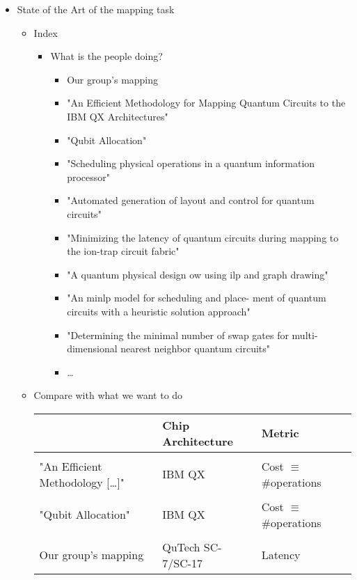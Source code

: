 \begin{itemize}
\item State of the Art of the mapping task
\label{sec:orgf682750}

\begin{itemize}
\item Index
\label{sec:org0689b92}
\begin{itemize}
\item What is the people doing?
\label{sec:org91237ce}
\small

\begin{itemize}
\item Our group's mapping
\item "An Efficient Methodology for Mapping Quantum Circuits to the IBM QX Architectures"
\item "Qubit Allocation"
\item "Scheduling physical operations in a quantum information processor"
\item "Automated generation of layout and control for quantum circuits"
\item "Minimizing the latency of quantum circuits during mapping to the ion-trap circuit fabric"
\item "A quantum physical design  ow using ilp and graph drawing"
\item "An minlp model for scheduling and place- ment of quantum circuits with a heuristic solution approach"
\item "Determining the minimal number of swap gates for multi- dimensional nearest neighbor quantum circuits"
\item \ldots{}
\end{itemize}
\end{itemize}

\item Compare with what we want to do
\label{sec:org0068caf}
\begin{table}[htbp]
\centering
\small
\begin{tabular}{p{3.5cm}|p{3cm}|p{3.5cm}}
 & Chip Architecture & Metric\\
\hline
 &  & \\
"An Efficient Methodology [\ldots{}]" & IBM QX & Cost \(\equiv\) \#operations\\
 &  & \\
"Qubit Allocation" & IBM QX & Cost \(\equiv\) \#operations\\
 &  & \\
Our group's mapping & QuTech SC-7/SC-17 & Latency\\
\end{tabular}
\end{table}


\end{itemize}
\end{itemize}
